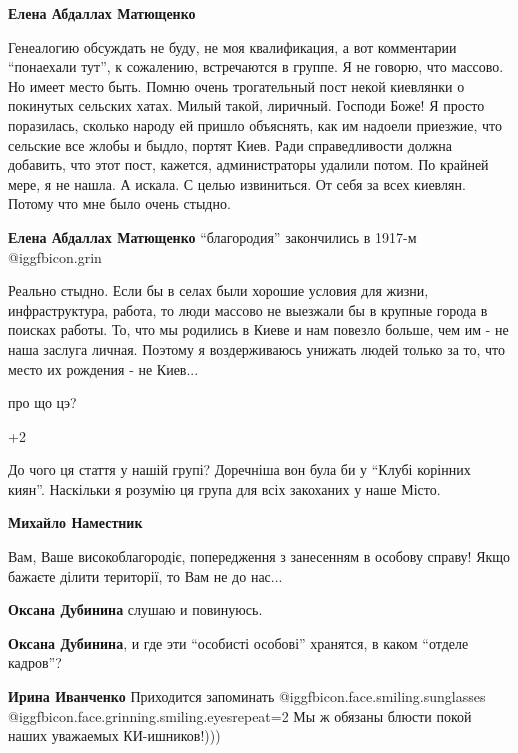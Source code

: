 \begin{itemize}
\begin{itemize}
\textbf{Елена Абдаллах Матющенко} 

Генеалогию обсуждать не буду, не моя квалификация, а вот комментарии \enquote{понаехали
тут}, к сожалению, встречаются в группе. Я не говорю, что массово. Но имеет
место быть. Помню очень трогательный пост некой киевлянки о покинутых сельских
хатах. Милый такой, лиричный. Господи Боже! Я просто поразилась, сколько народу
ей пришло объяснять, как им надоели приезжие, что сельские все жлобы и быдло,
портят Киев. Ради справедливости должна добавить, что этот пост, кажется,
администраторы удалили потом. По крайней мере, я не нашла. А искала. С целью
извиниться. От себя за всех киевлян. Потому что мне было очень стыдно.

\textbf{Елена Абдаллах Матющенко} \enquote{благородия} закончились в 1917-м  @igg{fbicon.grin} 


Реально стыдно. Если бы в селах были хорошие условия для
жизни, инфраструктура, работа, то люди массово не выезжали бы в крупные города в
поисках работы. То, что мы родились в Киеве и нам повезло больше, чем им - не наша
заслуга личная. Поэтому я воздерживаюсь унижать людей только за то, что место их
рождения - не Киев...

\end{itemize} %

про що цэ?


+2

До чого ця стаття у нашій групі? Доречніша вон була би у \enquote{Клубі корінних киян}.
Наскільки я розумію ця група для всіх закоханих у наше Місто.

\begin{itemize} %
\textbf{Михайло Наместник} 

Вам, Ваше високоблагородіє, попередження з занесенням в особову справу! Якщо
бажаєте ділити території, то Вам не до нас...

\begin{itemize} %
\textbf{Оксана Дубинина} слушаю и повинуюсь.

\textbf{Оксана Дубинина}, и где эти \enquote{особисті особові} хранятся, в каком \enquote{отделе кадров}?

\textbf{Ирина Иванченко}
Приходится запоминать @igg{fbicon.face.smiling.sunglasses}  @igg{fbicon.face.grinning.smiling.eyes}{repeat=2} 
Мы ж обязаны блюсти покой наших уважаемых КИ-ишников!)))
\end{itemize} %


\end{itemize}
\end{itemize}
